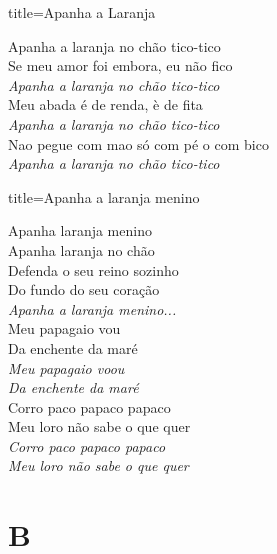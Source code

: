 \documentclass[fontsize=14pt, twoside]{scrreprt}
\newcommand\chapTOC[1]{
    \chapter*{#1}
    \addcontentsline{toc}{chapter}{#1}
    \markboth{#1}{#1}}
\begin{document}
\begin{multicols*}{2}
\begin{song}{title={Apanha a Laranja}}

    \begin{verse*}
        Apanha a laranja no chão tico-tico\\
        Se meu amor foi embora, eu não fico\\

        \textit{Apanha a laranja} \textit{no chão tico-tico}\\
        Meu abada é de renda, è de fita\\
        \textit{Apanha a laranja} \textit{no chão tico-tico}\\
        Nao pegue com mao só com pé o com bico\\
        \textit{Apanha a laranja} \textit{no chão tico-tico} \\  
    \end{verse*}

\end{song}



\columnbreak
\begin{song}{title={Apanha a laranja menino}}

    \begin{verse*}
        Apanha laranja menino\\
        Apanha laranja no chão\\
        Defenda o seu reino sozinho\\
        Do fundo do seu coração\\

        \textit{Apanha a laranja menino...}\\
        Meu papagaio vou\\
        Da enchente da maré\\
        \textit{Meu papagaio voou}\\
        \textit{Da enchente da maré}\\
        Corro paco papaco papaco\\
        Meu loro não sabe o que quer\\
        \textit{Corro paco papaco papaco}\\
        \textit{Meu loro não sabe o que quer}\\
    \end{verse*}
\end{song}


\newpage
\chapTOC{B}



\end{multicols*}
\end{document}
